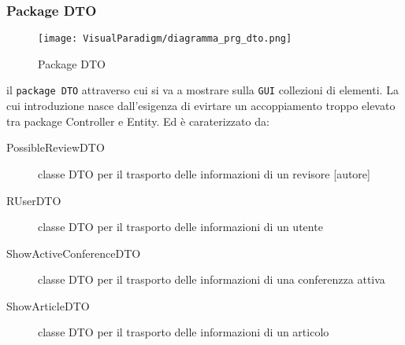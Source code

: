 \subsubsection{Package DTO}

\label{sec:package dto}
\begin{figure}[ht]
  \centering
  \texttt{[image: VisualParadigm/diagramma\_prg\_dto.png]}
  \caption{Package DTO}
  \label{fig:Package DTO}
\end{figure}

il \texttt{package DTO} attraverso cui si va a mostrare sulla \texttt{GUI} collezioni di elementi. La cui introduzione nasce dall'esigenza di evirtare un accoppiamento troppo elevato tra package Controller e Entity. Ed è caraterizzato da:
\begin{description}
\item[PossibleReviewDTO] classe DTO per il trasporto delle informazioni di un revisore [autore]
\item[RUserDTO] classe DTO per il trasporto delle informazioni di un utente
\item[ShowActiveConferenceDTO] classe DTO per il trasporto delle informazioni di una conferenzza attiva
\item[ShowArticleDTO] classe DTO per il trasporto delle informazioni di un articolo
\end{description}
